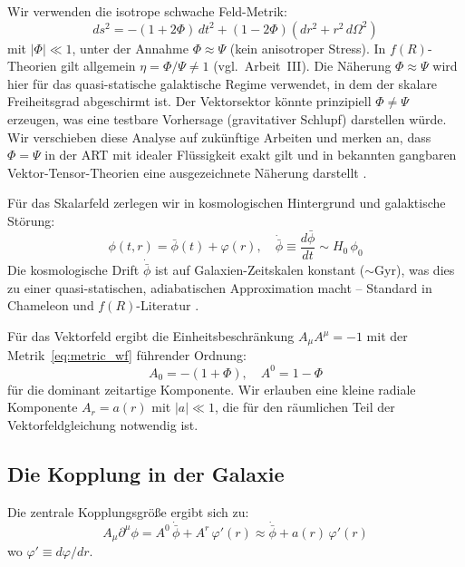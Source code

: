 \documentclass[aps,prd,twocolumn,superscriptaddress,nofootinbib]{revtex4-2}
\begin{document}
Wir verwenden die isotrope schwache Feld-Metrik:
\begin{equation}
ds^2 = -(1 + 2\Phi)\,dt^2 + (1 - 2\Phi)(dr^2 + r^2\,d\Omega^2)
\label{eq:metric_wf}
\end{equation}
mit $|\Phi| \ll 1$, unter der Annahme $\Phi \approx \Psi$ (kein anisotroper Stress). In $f(R)$-Theorien gilt allgemein $\eta = \Phi/\Psi \neq 1$ (vgl.\ Arbeit~III). Die N\"aherung $\Phi \approx \Psi$ wird hier f\"ur das quasi-statische galaktische Regime verwendet, in dem der skalare Freiheitsgrad abgeschirmt ist. Der Vektorsektor k\"onnte prinzipiell $\Phi \neq \Psi$ erzeugen, was eine testbare Vorhersage (gravitativer Schlupf) darstellen w\"urde. Wir verschieben diese Analyse auf zuk\"unftige Arbeiten und merken an, dass $\Phi = \Psi$ in der ART mit idealer Fl\"ussigkeit exakt gilt und in bekannten gangbaren Vektor-Tensor-Theorien eine ausgezeichnete N\"aherung darstellt \cite{Skordis2021}.

F\"ur das Skalarfeld zerlegen wir in kosmologischen Hintergrund und galaktische St\"orung:
\begin{equation}
\phi(t,r) = \bar{\phi}(t) + \varphi(r), \quad \dot{\bar{\phi}} \equiv \frac{d\bar{\phi}}{dt} \sim H_0\,\phi_0
\label{eq:phi_split}
\end{equation}
Die kosmologische Drift $\dot{\bar{\phi}}$ ist auf Galaxien-Zeitskalen konstant ($\sim$Gyr), was dies zu einer quasi-statischen, adiabatischen Approximation macht -- Standard in Chameleon und $f(R)$-Literatur \cite{HuSawicki2007}.

F\"ur das Vektorfeld ergibt die Einheitsbeschr\"ankung $A_\mu A^\mu = -1$ mit der Metrik~\eqref{eq:metric_wf} f\"uhrender Ordnung:
\begin{equation}
A_0 = -(1 + \Phi), \quad A^0 = 1 - \Phi
\label{eq:A0}
\end{equation}
f\"ur die dominant zeitartige Komponente. Wir erlauben eine kleine radiale Komponente $A_r = a(r)$ mit $|a| \ll 1$, die f\"ur den r\"aumlichen Teil der Vektorfeldgleichung notwendig ist.

\subsection{Die Kopplung in der Galaxie}
\label{sec:coupling_galaxy}

Die zentrale Kopplungsgr\"o\ss{}e ergibt sich zu:
\begin{equation}
A_\mu\partial^\mu\phi = A^0\,\dot{\bar{\phi}} + A^r\,\varphi'(r) \approx \dot{\bar{\phi}} + a(r)\,\varphi'(r)
\label{eq:Adphi_galaxy}
\end{equation}
wo $\varphi' \equiv d\varphi/dr$.
\end{document}
